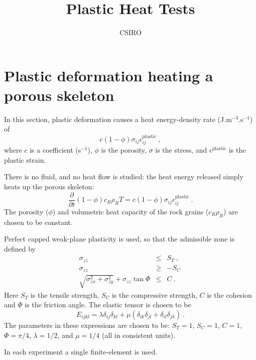 \documentclass[]{scrreprt}
\begin{document}
\title{Plastic Heat Tests}
\author{CSIRO}
\maketitle

\tableofcontents

\chapter{Plastic deformation heating a porous skeleton}

In this section, plastic deformation causes a heat energy-density rate
(J.m$^{-3}$.s$^{-1}$) of
\begin{equation}
c (1-\phi) \sigma_{ij}\epsilon^{\mathrm{plastic}}_{ij} \ ,
\end{equation}
where $c$ is a coefficient (s$^{-1}$), $\phi$ is the porosity,
$\sigma$ is the stress, and $\epsilon^{\mathrm{plastic}}$ is the
plastic strain.

There is no fluid, and no heat flow is studied: the heat energy
released simply heats up the porous skeleton:
\begin{equation}
\frac{\partial}{\partial t} (1 - \phi)c_{R}\rho_{R} T = c (1-\phi)
\sigma_{ij}\epsilon^{\mathrm{plastic}}_{ij} \ .
\end{equation}
The porosity ($\phi$) and volumetric heat
capacity of the rock grains ($c_{R}\rho_{R}$) are chosen to be constant.

Perfect capped weak-plane plasticity is used, so that the admissible
zone is defined by
\begin{eqnarray}
\sigma_{zz} & \leq & S_{T} \ , \\
\sigma_{zz} & \geq & -S_{C} \, \\
\sqrt{\sigma_{zx}^{2} + \sigma_{zy}^{2}} + \sigma_{zz}\tan\Phi & \leq
& C \ .
\end{eqnarray}
Here $S_{T}$ is the tensile strength, $S_{C}$ is the compressive
strength, $C$ is the cohesion and $\Phi$ is the friction angle.  The
elastic tensor is chosen to be
\begin{equation}
E_{ijkl} = \lambda \delta_{ij}\delta_{kl} + \mu
(\delta_{ik}\delta_{jl} + \delta_{il}\delta_{jk}) \ .
\end{equation}
The parameters in these expressions are chosen to be: $S_{T}=1$,
$S_{C}=1$, $C=1$, $\Phi=\pi/4$, $\lambda=1/2$, and $\mu=1/4$ (all in
consistent units).

In each experiment a single finite-element is used.
\end{document}
